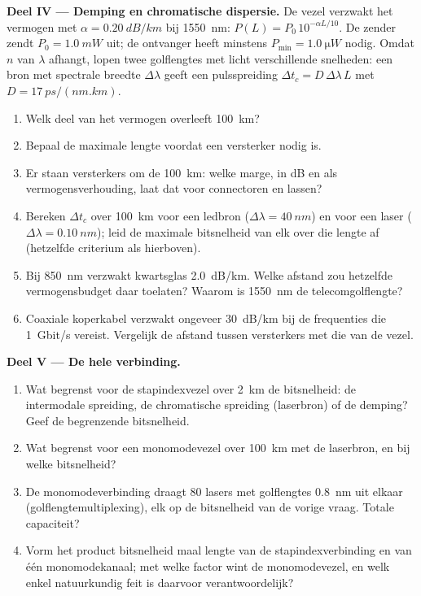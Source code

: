 \begin{problem}
\medskip
\noindent\textbf{Deel IV --- Demping en chromatische dispersie.}
De vezel verzwakt het vermogen met $\alpha = \qty{0.20}{dB/km}$ bij
\qty{1550}{nm}: $P(L) = P_0\,10^{-\alpha L/10}$. De zender
zendt $P_0 = \qty{1.0}{mW}$ uit; de ontvanger heeft minstens
$P_{\min} = \qty{1.0}{\micro W}$ nodig. Omdat $n$ van $\lambda$ afhangt,
lopen twee golflengtes met licht verschillende snelheden: een bron met
spectrale breedte $\Delta\lambda$ geeft een pulsspreiding $\Delta t_c = D\,\Delta\lambda\,L$
met $D = \qty{17}{ps/(nm.km)}$.
\begin{enumerate}[resume]
  \item Welk deel van het vermogen overleeft \qty{100}{km}?
  \item Bepaal de maximale lengte voordat een versterker nodig is.
  \item Er staan versterkers om de \qty{100}{km}: welke marge, in dB en
        als vermogensverhouding, laat dat voor connectoren en lassen?
  \item Bereken $\Delta t_c$ over \qty{100}{km} voor een ledbron
        ($\Delta\lambda = \qty{40}{nm}$) en voor een laser
        ($\Delta\lambda = \qty{0.10}{nm}$); leid de maximale bitsnelheid
        van elk over die lengte af (hetzelfde criterium als hierboven).
  \item Bij \qty{850}{nm} verzwakt kwartsglas \qty{2.0}{dB/km}. Welke
        afstand zou hetzelfde vermogensbudget daar toelaten? Waarom is
        \qty{1550}{nm} de telecomgolflengte?
  \item Coaxiale koperkabel verzwakt ongeveer \qty{30}{dB/km} bij de
        frequenties die \qty{1}{Gbit/s} vereist. Vergelijk de afstand
        tussen versterkers met die van de vezel.
\end{enumerate}

\medskip
\noindent\textbf{Deel V --- De hele verbinding.}
\begin{enumerate}[resume]
  \item Wat begrenst voor de stapindexvezel over \qty{2}{km} de
        bitsnelheid: de intermodale spreiding, de chromatische spreiding
        (laserbron) of de demping? Geef de begrenzende bitsnelheid.
  \item Wat begrenst voor een monomodevezel over \qty{100}{km} met de
        laserbron, en bij welke bitsnelheid?
  \item De monomodeverbinding draagt $80$ lasers met golflengtes
        \qty{0.8}{nm} uit elkaar (golflengtemultiplexing), elk op de
        bitsnelheid van de vorige vraag. Totale capaciteit?
  \item Vorm het product bitsnelheid maal lengte van de stapindexverbinding
        en van één monomodekanaal; met welke factor wint de monomodevezel,
        en welk enkel natuurkundig feit is daarvoor verantwoordelijk?
\end{enumerate}
\end{problem}
